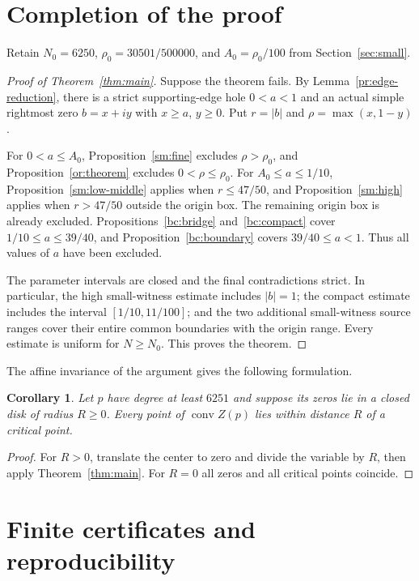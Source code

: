 \documentclass[11pt,reqno]{amsart}
\numberwithin{equation}{section}
\newtheorem{corollary}[theorem]{Corollary}
\theoremstyle{definition}
\theoremstyle{remark}
\DeclareMathOperator{\conv}{conv}
\begin{document}
\section{Completion of the proof}\label{sec:assembly}

Retain $N_0=6250$, $\rho_0=30501/500000$, and
$A_0=\rho_0/100$ from Section~\ref{sec:small}.
\begin{proof}[Proof of Theorem~\ref{thm:main}]
Suppose the theorem fails. By
Lemma~\ref{pr:edge-reduction}, there is a strict supporting-edge hole
$0<a<1$ and an actual simple rightmost zero $b=x+iy$ with
$x\ge a$, $y\ge0$. Put $r=|b|$ and $\rho=\max(x,1-y)$.

For $0<a\le A_0$, Proposition~\ref{sm:fine} excludes
$\rho>\rho_0$, and Proposition~\ref{or:theorem} excludes
$0<\rho\le\rho_0$. For $A_0\le a\le1/10$,
Proposition~\ref{sm:low-middle} applies when $r\le47/50$,
and Proposition~\ref{sm:high} applies when $r>47/50$ outside
the origin box. The remaining origin box is already excluded.
Propositions~\ref{bc:bridge} and~\ref{bc:compact} cover
$1/10\le a\le39/40$, and Proposition~\ref{bc:boundary}
covers $39/40\le a<1$. Thus all values of $a$ have been excluded.

The parameter intervals are closed and the final contradictions strict.
In particular, the high small-witness estimate includes $|b|=1$;
the compact estimate includes the interval $[1/10,11/100]$; and the
two additional small-witness source ranges cover their entire common
boundaries with the origin range. Every estimate is uniform for
$N\ge N_0$. This proves the theorem.
\end{proof}

The affine invariance of the argument gives the following formulation.
\begin{corollary}\label{cor:disk}
Let $p$ have degree at least $6251$ and suppose its zeros lie in a
closed disk of radius $R\ge0$. Every point of $\conv Z(p)$ lies
within distance $R$ of a critical point.
\end{corollary}
\begin{proof}
For $R>0$, translate the center to zero and divide the variable by
$R$, then apply Theorem~\ref{thm:main}. For $R=0$ all zeros and
all critical points coincide.
\end{proof}

\section{Finite certificates and reproducibility}\label{sec:certificates}
\end{document}
